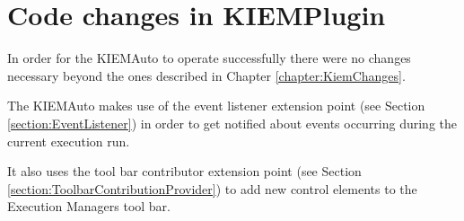 \chapter{Code changes in KIEMPlugin}
\label{chapter:AutoKiemChanges}
In order for the \ac{KIEMAuto} to operate successfully there were
no changes necessary beyond the ones described in Chapter \ref{chapter:KiemChanges}.

The \ac{KIEMAuto} makes use of the event listener extension point 
(see Section \ref{section:EventListener}) in order to get 
notified about events occurring during the current execution run.

It also uses the tool bar contributor extension point (see Section \ref{section:ToolbarContributionProvider})
to add new control elements to the Execution Managers tool bar.
